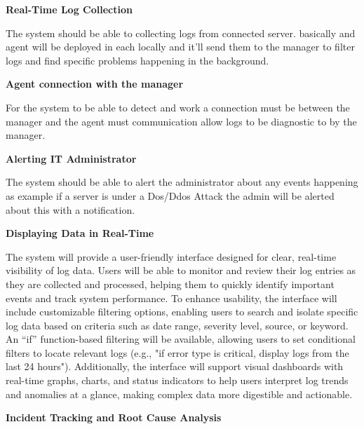 

\textbf{Real-Time Log Collection}

The system should be able to collecting logs from connected server. basically and agent will be deployed in each locally and it'll send them to the manager to filter logs and find specific problems happening in the background.

\textbf{Agent connection with the manager}

For the system to be able to detect and work a connection must be between the manager and the agent must communication allow logs to be diagnostic to by the manager.

\textbf{Alerting IT Administrator }

The system should be able to alert the administrator about any events happening as example if a server is under a Dos/Ddos Attack the admin will be alerted about this with a notification.

\textbf{Displaying Data in Real-Time}

The system will provide a user-friendly interface designed for clear, real-time visibility of log data. Users will be able to monitor and review their log entries as they are collected and processed, helping them to quickly identify important events and track system performance. To enhance usability, the interface will include customizable filtering options, enabling users to search and isolate specific log data based on criteria such as date range, severity level, source, or keyword. An “if” function-based filtering will be available, allowing users to set conditional filters to locate relevant logs (e.g., "if error type is critical, display logs from the last 24 hours"). Additionally, the interface will support visual dashboards with real-time graphs, charts, and status indicators to help users interpret log trends and anomalies at a glance, making complex data more digestible and actionable.

\textbf{Incident Tracking and Root Cause Analysis}

